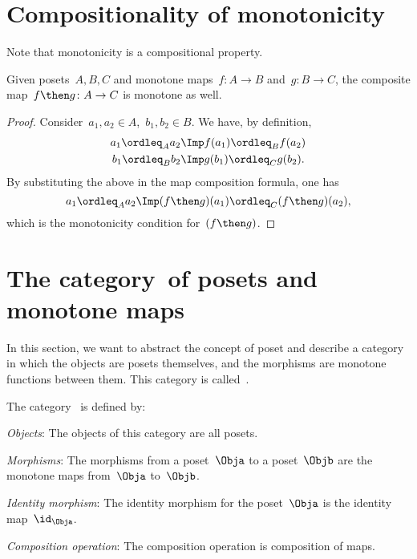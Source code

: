 \section{Compositionality of monotonicity}
Note that monotonicity is a compositional property.
\begin{lemma}
  Given posets~$A, B, C$ and monotone maps~$f\colon A \to B$ and~$g\colon B \to C$, the composite map~$f\then g\colon  A \to C$ is
  monotone as well.
\end{lemma}
\begin{proof}
  Consider~$a_1,a_2 \in A$,~$b_1,b_2\in B$. We have, by definition,
  \begin{equation}
    \begin{aligned}
      a_1\ordleq_A a_2 &\Imp f(a_1)\ordleq_B f(a_2)\\
      b_1\ordleq_B b_2 &\Imp g(b_1)\ordleq_C g(b_2).
    \end{aligned}
  \end{equation}
  By substituting the above in the map composition formula, one has
  \begin{equation}
    a_1\ordleq_A a_2 \Imp (f\then g)(a_1) \ordleq_C (f\then g)(a_2),
  \end{equation}
  which is the monotonicity condition for~$(f\then g)$.
\end{proof}

\section{The category~\Pos of posets and monotone maps}
In this section, we want to abstract the concept of poset and describe a category in which the objects are posets themselves, and the morphisms are monotone functions between them. This category is called~\Pos.

\begin{ctdefinition}
  The category~\index{\Pos} is defined by:
  \begin{compactenum}
    \item \emph{Objects}: The objects of this category are all posets.
    \item \emph{Morphisms}: The morphisms from a poset~$\Obja$ to a poset~$\Objb$ are the monotone maps from~$\Obja$ to~$\Objb$.
    \item \emph{Identity morphism}: The identity morphism for the poset~$\Obja$
    is the identity map~$\id_\Obja$.
    \item \emph{Composition operation}: The composition operation is composition of maps.
  \end{compactenum}
\end{ctdefinition}

